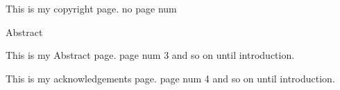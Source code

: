 
\begin{center}

This is my copyright page. no page num

\end{center}

\frontmatter

\setcounter{page}{3}  %

\begin{center}

Abstract

This is my Abstract page. page num 3 and so on until introduction.

\end{center}

\newpage

\begin{center}

This is my acknowledgements page. page num 4 and so on until introduction.

\end{center}
